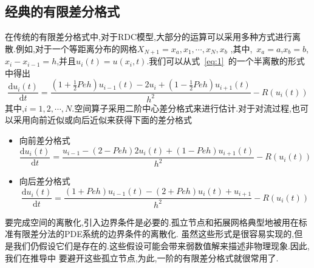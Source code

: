 \documentclass[a4paper,cs4size,adobefonts,cm-default,no-math]{ctexart}
\newcommand{\dif}{\mathrm{d}}
\begin{document}
\subsection{经典的有限差分格式}
在传统的有限差分格式中,对于RDC模型,大部分的运算可以采用多种方式进行离散.例如,对于一个等距离分布的网格$X_{N+1}=x_a,x_1,\cdots,x_N,x_b$
,其中,~$x_a=a$,$x_b=b$,$x_i-x_{i-1}=h$,并且$u_i(t)=u(x_i,t)$.我们可以从式~\ref{eq:1}~的一个半离散的形式中得出
\begin{equation}\label{eq:11}
 \dfrac{\dif u_i(t)}{\dif t}=\dfrac{(1+\frac{1}{2}Peh)u_{i-1}(t)-2u_i+(1-\frac{1}{2}Peh)u_{i+1}(t)}{h^2}-R(u_i(t))
\end{equation}
其中,$i=1,2,\cdots,N$.空间算子采用二阶中心差分格式来进行估计.对于对流过程,也可以采用向前近似或向后近似来获得下面的差分格式
\begin{itemize}
 \item 向前差分格式
 \begin{equation}\label{eq:12}
  \dfrac{\dif u_i(t)}{\dif t}=\dfrac{u_{i-1}-(2-Peh)2u_i(t)+(1-Peh)u_{i+1}(t)}{h^2}-R(u_i(t))
 \end{equation}
 \item 向后差分格式
 \begin{equation}\label{eq:13}
  \dfrac{\dif u_i(t)}{\dif t}=\dfrac{(1+Peh)u_{i-1}(t)-(2+Peh)u_i(t)+u_{i+1}}{h^2}-R(u_i(t))
 \end{equation}
\end{itemize}\par
要完成空间的离散化,引入边界条件是必要的.孤立节点和拓展网格典型地被用在标准有限差分法的PDE系统的边界条件的离散化.
虽然这些形式是很容易实现的,但是我们仍假设它们是存在的.这些假设可能会带来弱数值解来描述非物理现象.因此,我们在推导中
要避开这些孤立节点,为此,一阶的有限差分格式就很常用了.
\end{document}
